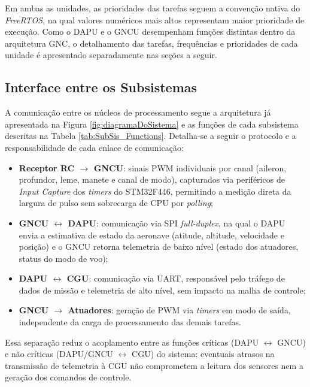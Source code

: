 Em ambas as unidades, as prioridades das tarefas seguem a convenção nativa do \textit{FreeRTOS}, na qual valores numéricos mais altos representam maior prioridade de execução. Como o DAPU e o GNCU desempenham funções distintas dentro da arquitetura GNC, o detalhamento das tarefas, frequências e prioridades de cada unidade é apresentado separadamente nas seções a seguir.

\subsection{Interface entre os Subsistemas}
\label{subsec:interfaceSubsistemas}

A comunicação entre os núcleos de processamento segue a arquitetura já apresentada na Figura \ref{fig:diagramaDoSistema} e as funções de cada subsistema descritas na Tabela \ref{tab:SubSis_Functions}. Detalha-se a seguir o protocolo e a responsabilidade de cada enlace de comunicação:

\begin{itemize}
    \item \textbf{Receptor RC $\rightarrow$ GNCU}: sinais PWM individuais
    por canal (aileron, profundor, leme, manete e canal de modo),
    capturados via periféricos de \textit{Input Capture} dos
    \textit{timers} do STM32F446, permitindo a medição direta da largura
    de pulso sem sobrecarga de CPU por \textit{polling};
 
    \item \textbf{GNCU $\leftrightarrow$ DAPU}: comunicação via SPI \textit{full-duplex}, na qual o DAPU envia a estimativa de estado da aeronave (atitude, altitude, velocidade e posição) e o GNCU retorna telemetria de baixo nível (estado dos atuadores, status do modo de voo);
 
    \item \textbf{DAPU $\leftrightarrow$ CGU}: comunicação via UART, responsável pelo tráfego de dados de missão e telemetria de alto nível, sem impacto na malha de controle;
 
    \item \textbf{GNCU $\rightarrow$ Atuadores}: geração de PWM via \textit{timers} em modo de saída, independente da carga de
    processamento das demais tarefas.
\end{itemize}

Essa separação reduz o acoplamento entre as funções críticas (DAPU $\leftrightarrow$ GNCU) e não críticas (DAPU/GNCU $\leftrightarrow$ CGU) do sistema: eventuais atrasos na transmissão de telemetria à CGU não comprometem a leitura dos sensores nem a geração dos comandos de controle.

